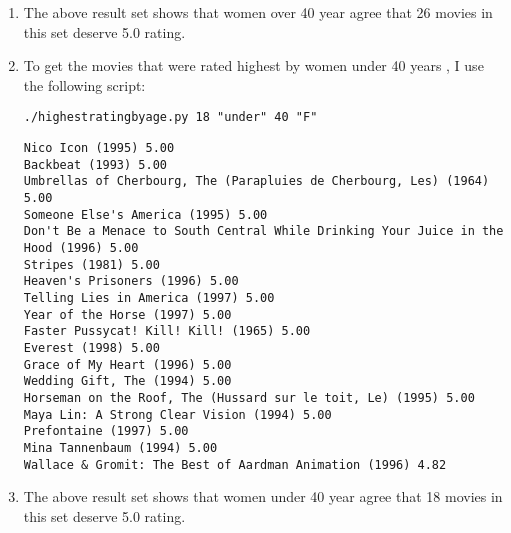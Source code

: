 \begin{enumerate}
\begin{lstlisting}[frame=single]
\end{lstlisting}
\item The above result set shows that women over 40 year agree that 26 movies in this set deserve 5.0 rating.
\item To get the movies that were rated highest by women under 40 years , I use the following script:
\begin{lstlisting}[frame=single]
 ./highestratingbyage.py 18 "under" 40 "F"
\end{lstlisting}
\begin{lstlisting}[frame=single,breaklines=true]
Nico Icon (1995) 5.00
Backbeat (1993) 5.00
Umbrellas of Cherbourg, The (Parapluies de Cherbourg, Les) (1964) 5.00
Someone Else's America (1995) 5.00
Don't Be a Menace to South Central While Drinking Your Juice in the Hood (1996) 5.00
Stripes (1981) 5.00
Heaven's Prisoners (1996) 5.00
Telling Lies in America (1997) 5.00
Year of the Horse (1997) 5.00
Faster Pussycat! Kill! Kill! (1965) 5.00
Everest (1998) 5.00
Grace of My Heart (1996) 5.00
Wedding Gift, The (1994) 5.00
Horseman on the Roof, The (Hussard sur le toit, Le) (1995) 5.00
Maya Lin: A Strong Clear Vision (1994) 5.00
Prefontaine (1997) 5.00
Mina Tannenbaum (1994) 5.00
Wallace & Gromit: The Best of Aardman Animation (1996) 4.82

\end{lstlisting}
\item The above result set shows that women under 40 year agree that 18 movies in this set deserve 5.0 rating.
\end{enumerate} 

\newpage

